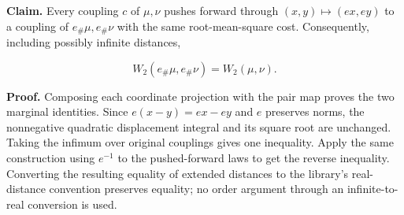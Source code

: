 \documentclass[11pt,a4paper]{report}
\begin{document}
\textbf{Claim.} Every coupling \(c\) of \(\mu,\nu\) pushes forward through \((x,y)\mapsto(e x,e y)\) to a coupling of \(e_\#\mu,e_\#\nu\) with the same root-mean-square cost. Consequently, including possibly infinite distances,

\[W_2(e_\#\mu,e_\#\nu)=W_2(\mu,\nu).\]


\textbf{Proof.} Composing each coordinate projection with the pair map proves the two marginal identities. Since \(e(x-y)=e x-e y\) and \(e\) preserves norms, the nonnegative quadratic displacement integral and its square root are unchanged. Taking the infimum over original couplings gives one inequality. Apply the same construction using \(e^{-1}\) to the pushed-forward laws to get the reverse inequality. Converting the resulting equality of extended distances to the library's real-distance convention preserves equality; no order argument through an infinite-to-real conversion is used.
\end{document}
